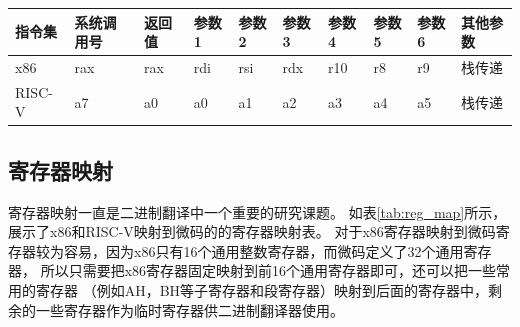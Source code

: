 \begin{table}[h]
    \centering
    \footnotesize%
    \setlength{\tabcolsep}{4pt}%
    \renewcommand{\arraystretch}{1.2}%
      \begin{tabular}{llllllllll}
      \hline
      指令集 & 系统调用号 & 返回值 & 参数1 & 参数2 & 参数3 & 参数4 & 参数5 & 参数6 & 其他参数 \\ \hline
      x86     & rax    & rax   & rdi & rsi & rdx & r10 & r8  & r9  & 栈传递  \\
      RISC-V  & a7     & a0    & a0  & a1  & a2  & a3  & a4  & a5  & 栈传递 \\
      \hline
      \end{tabular}
    \label{tab:syscall}
  \end{table}
  

\subsection{寄存器映射}

寄存器映射一直是二进制翻译中一个重要的研究课题。
如表\ref{tab:reg_map}所示，展示了x86和RISC-V映射到微码的的寄存器映射表。
对于x86寄存器映射到微码寄存器较为容易，因为x86只有16个通用整数寄存器，而微码定义了32个通用寄存器，
所以只需要把x86寄存器固定映射到前16个通用寄存器即可，还可以把一些常用的寄存器
（例如AH，BH等子寄存器和段寄存器）映射到后面的寄存器中，剩余的一些寄存器作为临时寄存器供二进制翻译器使用。

